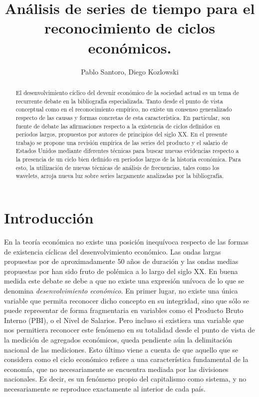 \documentclass[a4paper]{article}
\title{Análisis de series de tiempo para el reconocimiento de ciclos económicos.}
\author{Pablo Santoro, Diego Kozlowski}
\begin{document}
\maketitle

\begin{abstract}
	
	El desenvolvimiento cíclico del devenir económico de la sociedad actual es un tema de recurrente debate en la bibliografía especializada. Tanto desde el punto de vista conceptual como en el reconocimiento empírico, no existe un consenso generalizado respecto de las causas y formas concretas de esta característica. En particular, son fuente de debate las afirmaciones respecto a la existencia de ciclos definidos en períodos largos, propuestos por autores de principios del siglo XX. En el presente trabajo se propone una revisión empírica de las series del producto y el salario de Estados Unidos mediante diferentes técnicas para buscar nuevas evidencias respecto a la presencia de un ciclo bien definido en períodos largos de la historia económica. Para esto, la utilización de nuevas técnicas de análisis de frecuencias, tales como los wavelets, arroja nueva luz sobre series largamente analizadas por la bibliografía.
\end{abstract}

\section{Introducción}

En la teoría económica no existe una posición inequívoca respecto de las formas de existencia cíclicas del desenvolvimiento económico. Las ondas largas propuestas por \cite{kondratieff1979long} de aproximadamente 50 años de duración y las ondas medias propuestas por \cite{kuznets1930secular} han sido fruto de polémica a lo largo del siglo XX. En buena medida este debate se debe a que no existe una expresión unívoca de lo que se denomina \textit{desenvolvimiento económico}. En primer lugar, no existe una única variable que permita reconocer dicho concepto en su integridad, sino que sólo se puede representar de forma fragmentaria en variables como el Producto Bruto Interno (PBI), o el Nivel de Salarios. Pero incluso si existiera una variable que nos permitiera reconocer este fenómeno en su totalidad desde el punto de vista de la medición de agregados económicos, queda pendiente aún la delimitación nacional de las mediciones. Esto último viene a cuenta de que aquello que se considera como el ciclo económico refiere a una característica fundamental de la economía, que no necesariamente se encuentra mediada por las divisiones nacionales. Es decir, es un fenómeno propio del capitalismo como sistema, y no necesariamente se reproduce exactamente al interior de cada país. 
\end{document}
